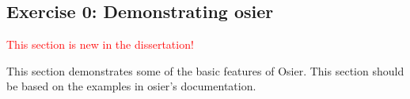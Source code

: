 \subsection{Exercise 0: Demonstrating \ac{osier}}
\textcolor{red}{This section is new in the dissertation!}

This section demonstrates some of the basic features of Osier. This section should be based 
on the examples in \ac{osier}'s documentation.
